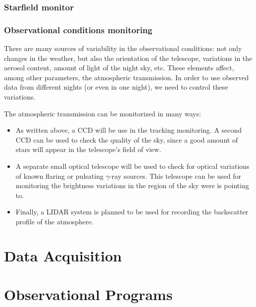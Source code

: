 \subsubsection{Starfield monitor}
%


\subsubsection{Observational conditions monitoring}
%
There are many sources of variability in the observational conditions:
not only changes in the weather, but also the orientation of the
telescope, variations in the aerosol content, amount of light of the
night sky, etc.  These elements affect, among other parameters, the
atmospheric transmission. In order to use observed data from different
nights (or even in one night), we need to control these variations.

The atmospheric transmission can be monitorized in many ways:
\begin{itemize}
\item As written above, a CCD will be use in the tracking monitoring.
  A second CCD can be used to check the quality of the sky, since a
  good amount of stars will appear in the telescope's field of view.

\item A separate small optical telescope will be used to check for
  optical variations of known flaring or pulsating $\gamma$-ray
  sources. This telescope can be used for monitoring the brightness
  variations in the region of the sky were \MAGIC is pointing to.

\item Finally, a LIDAR system is planned to be used for recording the
  backscatter profile of the atmosphere.
\end{itemize}

\section{Data Acquisition}
%

\section{Observational Programs}
%


\endinput
%

